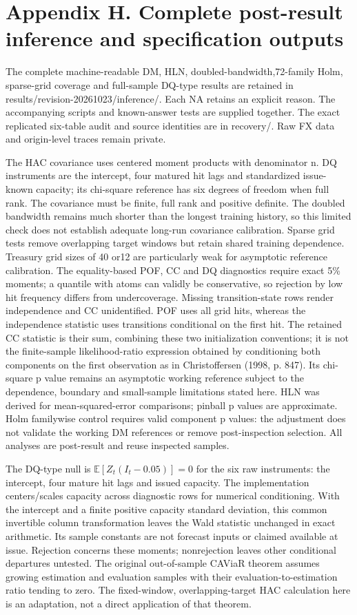\documentclass[10pt,a4paper]{article}
\begin{document}
\section*{Appendix H. Complete post-result inference and specification outputs}
The complete machine-readable DM, HLN, doubled-bandwidth,72-family Holm, sparse-grid coverage and full-sample DQ-type results are retained in results/revision-20261023/inference/. Each NA retains an explicit reason. The accompanying scripts and known-answer tests are supplied together. The exact replicated six-table audit and source identities are in recovery/. Raw FX data and origin-level traces remain private.

The HAC covariance uses centered moment products with denominator n. DQ instruments are the intercept, four matured hit lags and standardized issue-known capacity; its chi-square reference has six degrees of freedom when full rank. The covariance must be finite, full rank and positive definite. The doubled bandwidth remains much shorter than the longest training history, so this limited check does not establish adequate long-run covariance calibration. Sparse grid tests remove overlapping target windows but retain shared training dependence. Treasury grid sizes of 40 or12 are particularly weak for asymptotic reference calibration. The equality-based POF, CC and DQ diagnostics require exact 5\% moments; a quantile with atoms can validly be conservative, so rejection by low hit frequency differs from undercoverage. Missing transition-state rows render independence and CC unidentified. POF uses all grid hits, whereas the independence statistic uses transitions conditional on the first hit. The retained CC statistic is their sum, combining these two initialization conventions; it is not the finite-sample likelihood-ratio expression obtained by conditioning both components on the first observation as in Christoffersen (1998, p. 847). Its chi-square p value remains an asymptotic working reference subject to the dependence, boundary and small-sample limitations stated here. HLN was derived for mean-squared-error comparisons; pinball p values are approximate. Holm familywise control requires valid component p values: the adjustment does not validate the working DM references or remove post-inspection selection. All analyses are post-result and reuse inspected samples.

The DQ-type null is \(\mathbb E[Z_t(I_t-0.05)]=0\) for the six raw instruments: the intercept, four mature hit lags and issued capacity. The implementation centers/scales capacity across diagnostic rows for numerical conditioning. With the intercept and a finite positive capacity standard deviation, this common invertible column transformation leaves the Wald statistic unchanged in exact arithmetic. Its sample constants are not forecast inputs or claimed available at issue. Rejection concerns these moments; nonrejection leaves other conditional departures untested. The original out-of-sample CAViaR theorem assumes growing estimation and evaluation samples with their evaluation-to-estimation ratio tending to zero. The fixed-window, overlapping-target HAC calculation here is an adaptation, not a direct application of that theorem.
\end{document}
